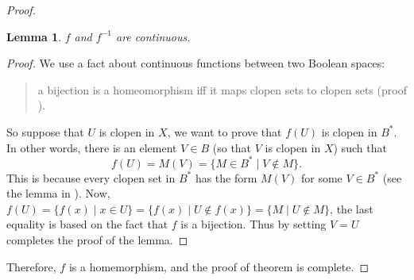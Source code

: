 \documentclass[12pt]{article}
\newtheorem{lem}{Lemma}
\begin{document}
\begin{proof}
\begin{lem} $f$ and $f^{-1}$ are continuous. \end{lem}
\begin{proof}  We use a fact about continuous functions between two Boolean spaces: 
\begin{quote}
a bijection is a homeomorphism iff it maps clopen sets to clopen sets (proof ).
\end{quote}
So suppose that $U$ is clopen in $X$, we want to prove that $f(U)$ is clopen in $B^*$.  In other words, there is an element $V\in B$ (so that $V$ is clopen in $X$) such that $$f(U)=M(V)=\lbrace M\in B^* \mid V\notin M\rbrace.$$  This is because every clopen set in $B^*$ has the form $M(V)$ for some $V\in B^*$ (see the lemma in ).  Now, $f(U)= \lbrace f(x)\mid x\in U\rbrace = \lbrace f(x)\mid U\notin f(x)\rbrace = \lbrace M\mid U\notin M\rbrace$, the last equality is based on the fact that $f$ is a bijection.  Thus by setting $V=U$ completes the proof of the lemma.
\end{proof}
Therefore, $f$ is a homemorphism, and the proof of theorem is complete.
\end{proof}
\end{document}
